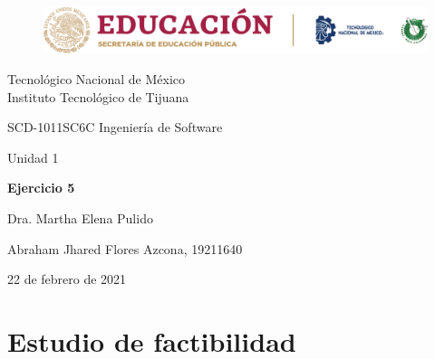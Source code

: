 \documentclass[stu, 12pt, letterpaper, donotrepeattitle, floatsintext, natbib]{apa7}
\begin{document}
    \begin{titlepage}
        \begin{figure}[ht]
            \centering
            \includegraphics[width=15cm]{logosITT.png}
        \end{figure}
        \centering
        {\Large Tecnológico Nacional de México\\Instituto Tecnológico de Tijuana\par}
        \vspace{1cm}
        {\Large SCD-1011SC6C Ingeniería de Software\par}
        \vspace{1cm}
        {\Large Unidad 1\par}
        \vspace{2cm}
        {\Large\bfseries Ejercicio 5\par}
        \vspace{2cm}
        {\large Dra. Martha Elena Pulido\par}
        \vfill
            {\large Abraham Jhared Flores Azcona, 19211640\par}
        \vfill
        {\large 22 de febrero de 2021}
    \end{titlepage}

\renewcommand\contentsname{Contenido}
\tableofcontents

\newpage
\section{Estudio de factibilidad}
\end{document}
